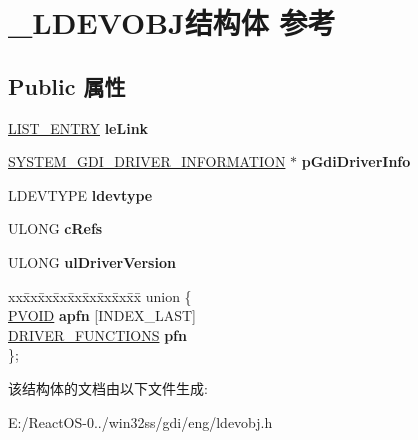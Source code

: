 \hypertarget{struct___l_d_e_v_o_b_j}{}\section{\+\_\+\+L\+D\+E\+V\+O\+B\+J结构体 参考}
\label{struct___l_d_e_v_o_b_j}
\subsection*{Public 属性}
\begin{DoxyCompactItemize}
\item 
\mbox{\label{struct___l_d_e_v_o_b_j_a4d53e00a0f7349a6aa69591f4f4c3216}} 
\hyperlink{struct___l_i_s_t___e_n_t_r_y}{L\+I\+S\+T\+\_\+\+E\+N\+T\+RY} {\bfseries le\+Link}
\item 
\mbox{\label{struct___l_d_e_v_o_b_j_a5c775cb17dcc5fd76a75111807fc8a24}} 
\hyperlink{struct___s_y_s_t_e_m___g_d_i___d_r_i_v_e_r___i_n_f_o_r_m_a_t_i_o_n}{S\+Y\+S\+T\+E\+M\+\_\+\+G\+D\+I\+\_\+\+D\+R\+I\+V\+E\+R\+\_\+\+I\+N\+F\+O\+R\+M\+A\+T\+I\+ON} $\ast$ {\bfseries p\+Gdi\+Driver\+Info}
\item 
\mbox{\label{struct___l_d_e_v_o_b_j_acf49e11b2116f23eaa2a0cc2b0cbaa03}} 
L\+D\+E\+V\+T\+Y\+PE {\bfseries ldevtype}
\item 
\mbox{\label{struct___l_d_e_v_o_b_j_abb7275f76b83c850349f7d896312a695}} 
U\+L\+O\+NG {\bfseries c\+Refs}
\item 
\mbox{\label{struct___l_d_e_v_o_b_j_acdda9fd003888dbd5cf143f576432bd4}} 
U\+L\+O\+NG {\bfseries ul\+Driver\+Version}
\item 
\mbox{\label{struct___l_d_e_v_o_b_j_a996e39918d7cce3b6b104ab593fd9ba0}} 
\begin{tabbing}
xx\=xx\=xx\=xx\=xx\=xx\=xx\=xx\=xx\=\kill
union \{\\
\>\hyperlink{interfacevoid}{PVOID} {\bfseries apfn} \mbox{[}INDEX\_LAST\mbox{]}\\
\>\hyperlink{struct___d_r_i_v_e_r___f_u_n_c_t_i_o_n_s}{DRIVER\_FUNCTIONS} {\bfseries pfn}\\
\}; \\

\end{tabbing}\end{DoxyCompactItemize}


该结构体的文档由以下文件生成\+:\begin{DoxyCompactItemize}
\item 
E\+:/\+React\+O\+S-\/0../win32ss/gdi/eng/ldevobj.\+h\end{DoxyCompactItemize}
